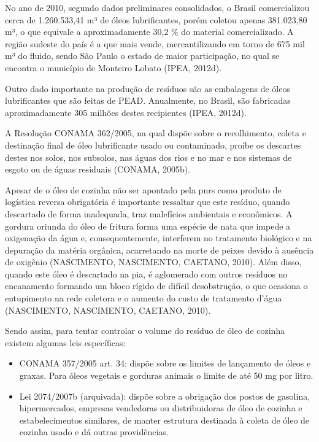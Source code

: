 \begin{description}
	No ano de 2010, segundo dados preliminares consolidados, o Brasil comercializou cerca de 1.260.533,41 m³ de óleos lubrificantes, porém coletou apenas 381.023,80 m³, o que equivale a aproximadamente 30,2 \% do material comercializado. A região sudeste do país é a que mais vende, mercantilizando em torno de 675 mil m³ do fluido, sendo São Paulo o estado de maior participação, no qual se encontra o município de Monteiro Lobato (IPEA, 2012d). 
	
	Outro dado importante na produção de resíduos são as embalagens de óleos lubrificantes que são feitas de PEAD. Anualmente, no Brasil, são fabricadas aproximadamente 305 milhões destes recipientes (IPEA, 2012d).
	
	A Resolução CONAMA 362/2005, na qual dispõe sobre o recolhimento, coleta e destinação final de óleo lubrificante usado ou contaminado, proíbe os descartes destes nos solos, nos subsolos, nas águas dos rios e no mar e nos sistemas de esgoto ou de águas residuais (CONAMA, 2005b).
	
	Apesar de o óleo de cozinha não ser apontado pela \gls{pnrs} como produto de logística reversa obrigatória é importante ressaltar que este resíduo, quando descartado de forma inadequada, traz malefícios ambientais e econômicos. A gordura oriunda do óleo de fritura forma uma espécie de nata que impede a oxigenação da água e, consequentemente, interferem no tratamento biológico e na depuração da matéria orgânica, acarretando na morte de peixes devido à ausência de oxigênio (NASCIMENTO, NASCIMENTO, CAETANO, 2010). Além disso, quando este óleo é descartado na pia, é aglomerado com outros resíduos no encanamento formando um bloco rígido de difícil desobstrução, o que ocasiona o entupimento na rede coletora e o aumento do custo de tratamento d’água (NASCIMENTO, NASCIMENTO, CAETANO, 2010). 
	
	Sendo assim, para tentar controlar o volume do resíduo de óleo de cozinha existem algumas leis específicas: 
	
	\begin{itemize}
		\item CONAMA 357/2005 art. 34: dispõe sobre os limites de lançamento de óleos e graxas. Para óleos vegetais e gorduras animais o limite de até 50 mg por litro.
		\item Lei 2074/2007b (arquivada): dispõe sobre a obrigação dos postos de gasolina, hipermercados, empresas vendedoras ou distribuidoras de óleo de cozinha e estabelecimentos similares, de manter estrutura destinada à coleta de óleo de cozinha usado e dá outras providências. 
	\end{itemize}
	

\end{description}
